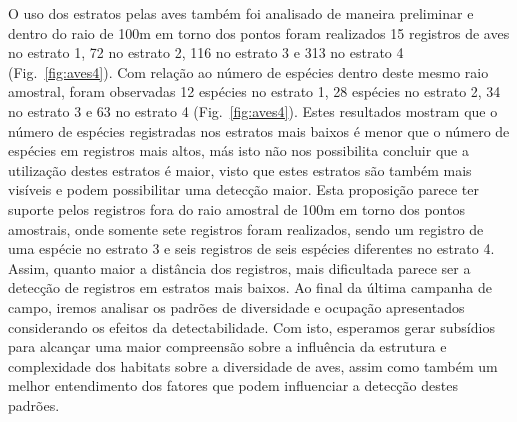 O uso dos estratos pelas aves também foi analisado de maneira
preliminar e dentro do raio de 100m em torno dos pontos foram
realizados 15 registros de aves no estrato 1, 72 no estrato 2, 116 no
estrato 3 e 313 no estrato 4 (Fig.~\ref{fig:aves4}). Com relação ao número de
espécies dentro deste mesmo raio amostral, foram observadas 12
espécies no estrato 1, 28 espécies no estrato 2, 34 no estrato 3 e 63
no estrato 4 (Fig.~\ref{fig:aves4}). Estes resultados mostram que o número de
espécies registradas nos estratos mais baixos é menor que o número de
espécies em registros mais altos, más isto não nos possibilita
concluir que a utilização destes estratos é maior, visto que estes
estratos são também mais visíveis e podem possibilitar uma detecção
maior. Esta proposição parece ter suporte pelos registros fora do raio
amostral de 100m em torno dos pontos amostrais, onde somente sete
registros foram realizados, sendo um registro de uma espécie no
estrato 3 e seis registros de seis espécies diferentes no estrato
4. Assim, quanto maior a distância dos registros, mais dificultada
parece ser a detecção de registros em estratos mais baixos. Ao final
da última campanha de campo, iremos analisar os padrões de diversidade
e ocupação apresentados considerando os efeitos da
detectabilidade. Com isto, esperamos gerar subsídios para alcançar uma
maior compreensão sobre a influência da estrutura e complexidade dos
habitats sobre a diversidade de aves, assim como também um melhor
entendimento dos fatores que podem influenciar a detecção destes
padrões.